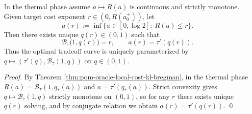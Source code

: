 \begin{corollary}\label{cor:pom-oracle-rate-budget-bregman-isodistance}
In the thermal phase assume \(a\mapsto R(a)\) is continuous and strictly monotone.
Given target cost exponent \(r\in(0,R(a_0^+))\), let
\[
a(r):=\inf\{a\in[0,\log 2]:\ R(a)\le r\}.
\]
Then there exists unique \(q(r)\in(0,1)\) such that
\[
\mathcal{B}_{\tau}\bigl(1,q(r)\bigr)=r,
\qquad
a(r)=\tau'(q(r)).
\]
Thus the optimal tradeoff curve is uniquely parameterized by \(q\mapsto(\tau'(q),\mathcal{B}_{\tau}(1,q))\) on \(q\in(0,1)\).
\end{corollary}
\begin{proof}
By Theorem \ref{thm:pom-oracle-local-cost-kl-bregman}, in the thermal phase \(R(a)=\mathcal{B}_{\tau}(1,q_*(a))\) and \(a=\tau'(q_*(a))\).
Strict convexity gives \(q\mapsto \mathcal{B}_{\tau}(1,q)\) strictly monotone on \((0,1)\), so for any \(r\) there exists unique \(q(r)\) solving, and by conjugate relation we obtain \(a(r)=\tau'(q(r))\). \qed
\end{proof}

